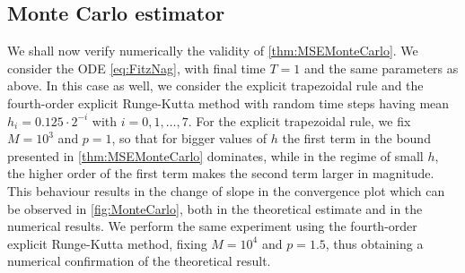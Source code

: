\documentclass[10pt]{article}
\begin{document}
\subsection{Monte Carlo estimator} 
We shall now verify numerically the validity of \cref{thm:MSEMonteCarlo}. We consider the ODE \eqref{eq:FitzNag}, with final time $T = 1$ and the same parameters as above. In this case as well, we consider the explicit trapezoidal rule and the fourth-order explicit Runge-Kutta method with random time steps having mean $h_i = 0.125\cdot 2^{-i}$ with $i = 0, 1, \ldots, 7$. For the explicit trapezoidal rule, we fix $M = 10^3$ and $p = 1$, so that for bigger values of $h$ the first term in the bound presented in \cref{thm:MSEMonteCarlo} dominates, while in the regime of small $h$, the higher order of the first term makes the second term larger in magnitude. This behaviour results in the change of slope in the convergence plot which can be observed in \cref{fig:MonteCarlo}, both in the theoretical estimate and in the numerical results. We perform the same experiment using the fourth-order explicit Runge-Kutta method, fixing $M = 10^4$ and $p = 1.5$, thus obtaining a numerical confirmation of the theoretical result.
\end{document}
